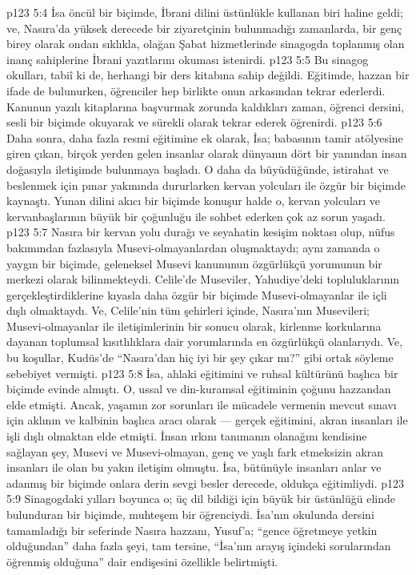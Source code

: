 \vs p123 5:4 İsa öncül bir biçimde, İbrani dilini üstünlükle kullanan biri haline geldi; ve, Nasıra’da yüksek derecede bir ziyaretçinin bulunmadığı zamanlarda, bir genç birey olarak ondan sıklıkla, olağan Şabat hizmetlerinde sinagogda toplanmış olan inanç sahiplerine İbrani yazıtlarını okuması istenirdi.
\vs p123 5:5 Bu sinagog okulları, tabiî ki de, herhangi bir ders kitabına sahip değildi. Eğitimde, hazzan bir ifade de bulunurken, öğrenciler hep birlikte onun arkasından tekrar ederlerdi. Kanunun yazılı kitaplarına başvurmak zorunda kaldıkları zaman, öğrenci dersini, sesli bir biçimde okuyarak ve sürekli olarak tekrar ederek öğrenirdi.
\vs p123 5:6 Daha sonra, daha fazla resmi eğitimine ek olarak, İsa; babasının tamir atölyesine giren çıkan, birçok yerden gelen insanlar olarak dünyanın dört bir yanından insan doğasıyla iletişimde bulunmaya başladı. O daha da büyüdüğünde, istirahat ve beslenmek için pınar yakınında dururlarken kervan yolcuları ile özgür bir biçimde kaynaştı. Yunan dilini akıcı bir biçimde konuşur halde o, kervan yolcuları ve kervanbaşlarının büyük bir çoğunluğu ile sohbet ederken çok az sorun yaşadı.
\vs p123 5:7 Nasıra bir kervan yolu durağı ve seyahatin kesişim noktası olup, nüfus bakımından fazlasıyla Musevi\hyp{}olmayanlardan oluşmaktaydı; aynı zamanda o yaygın bir biçimde, geleneksel Musevi kanununun özgürlükçü yorumunun bir merkezi olarak bilinmekteydi. Celile’de Museviler, Yahudiye’deki topluluklarının gerçekleştirdiklerine kıyasla daha özgür bir biçimde Musevi\hyp{}olmayanlar ile içli dışlı olmaktaydı. Ve, Celile’nin tüm şehirleri içinde, Nasıra’nın Musevileri; Musevi\hyp{}olmayanlar ile iletişimlerinin bir sonucu olarak, kirlenme korkularına dayanan toplumsal kısıtlılıklara dair yorumlarında en özgürlükçü olanlarıydı. Ve, bu koşullar, Kudüs’de “Nasıra’dan hiç iyi bir şey çıkar mı?” gibi ortak söyleme sebebiyet vermişti.
\vs p123 5:8 İsa, ahlaki eğitimini ve ruhsal kültürünü başlıca bir biçimde evinde almıştı. O, ussal ve din\hyp{}kuramsal eğitiminin çoğunu hazzandan elde etmişti. Ancak, yaşamın zor sorunları ile mücadele vermenin mevcut sınavı için aklının ve kalbinin başlıca aracı olarak --- gerçek eğitimini, akran insanları ile işli dışlı olmaktan elde etmişti. İnsan ırkını tanımanın olanağını kendisine sağlayan şey, Musevi ve Musevi\hyp{}olmayan, genç ve yaşlı fark etmeksizin akran insanları ile olan bu yakın iletişim olmuştu. İsa, bütünüyle insanları anlar ve adanmış bir biçimde onlara derin sevgi besler derecede, oldukça eğitimliydi.
\vs p123 5:9 Sinagogdaki yılları boyunca o; üç dil bildiği için büyük bir üstünlüğü elinde bulunduran bir biçimde, muhteşem bir öğrenciydi. İsa’nın okulunda dersini tamamladığı bir seferinde Nasıra hazzanı, Yusuf’a; “gence öğretmeye yetkin olduğundan” daha fazla şeyi, tam tersine, “İsa’nın arayış içindeki sorularından öğrenmiş olduğuna” dair endişesini özellikle belirtmişti.
